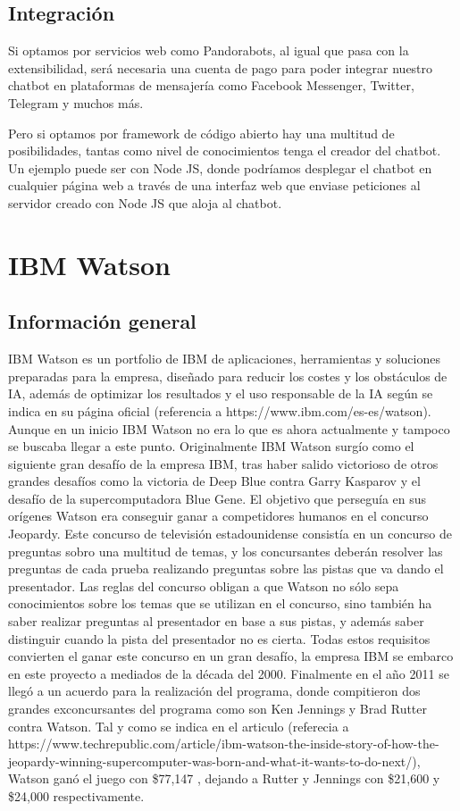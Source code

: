 \subsection*{Integración}

Si optamos por servicios web como Pandorabots, al igual que pasa con la extensibilidad, será necesaria una cuenta de pago para poder integrar nuestro chatbot en plataformas de mensajería como Facebook Messenger, Twitter, Telegram y muchos más.

Pero si optamos por framework de código abierto hay una multitud de posibilidades, tantas como nivel de conocimientos tenga el creador del chatbot. Un ejemplo puede ser con Node JS, donde podríamos desplegar el chatbot en cualquier página web a través de una interfaz web que enviase peticiones al servidor creado con Node JS que aloja al chatbot.


\section{IBM Watson}

\subsection*{Información general}

IBM Watson es un portfolio de IBM de aplicaciones, herramientas y soluciones preparadas para la empresa, diseñado para reducir los costes y los obstáculos de IA, además de optimizar los resultados y el uso responsable de la IA según se indica en su página oficial (referencia a https://www.ibm.com/es-es/watson). Aunque en un inicio IBM Watson no era lo que es ahora actualmente y tampoco se buscaba llegar a este punto. Originalmente IBM Watson surgío como el siguiente gran desafío de la empresa IBM, tras haber salido victorioso de otros grandes desafíos como la victoria de Deep Blue contra Garry Kasparov y el desafío de la supercomputadora Blue Gene. El objetivo que perseguía en sus orígenes Watson era conseguir ganar a competidores humanos en el concurso Jeopardy. Este concurso de televisión estadounidense consistía en un concurso de preguntas sobro una multitud de temas, y los concursantes deberán resolver las preguntas de cada prueba realizando preguntas sobre las pistas que va dando el presentador. Las reglas del concurso obligan a que Watson no sólo sepa conocimientos sobre los temas que se utilizan en el concurso, sino también ha saber realizar preguntas al presentador en base a sus pistas, y además saber distinguir cuando la pista del presentador no es cierta. Todas estos requisitos convierten el ganar este concurso en un gran desafío, la empresa IBM se embarco en este proyecto a mediados de la década del 2000. Finalmente en el año 2011 se llegó a un acuerdo para la realización del programa, donde compitieron dos grandes exconcursantes del programa como son Ken Jennings y Brad Rutter contra Watson. Tal y como se indica en el articulo (referecia a https://www.techrepublic.com/article/ibm-watson-the-inside-story-of-how-the-jeopardy-winning-supercomputer-was-born-and-what-it-wants-to-do-next/), Watson ganó el juego con \$77,147 , dejando a Rutter y Jennings con \$21,600 y \$24,000 respectivamente.

